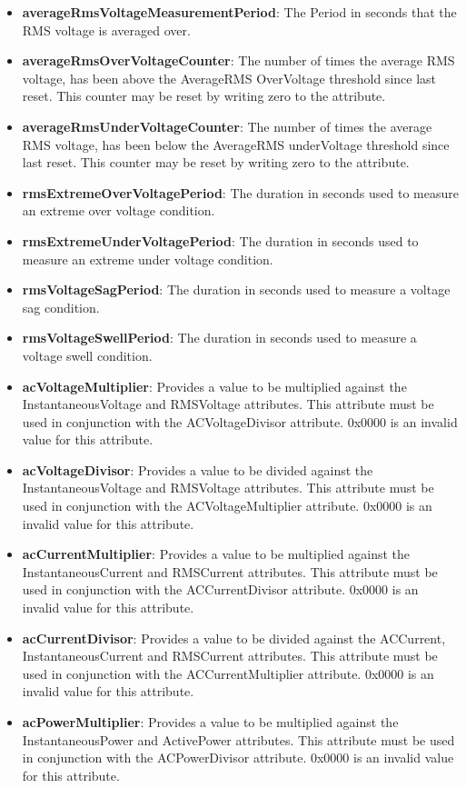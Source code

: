 \begin{itemize}
\item \textbf{averageRmsVoltageMeasurementPeriod}: The Period in seconds that the RMS voltage is averaged over.
\item \textbf{averageRmsOverVoltageCounter}: The number of times the average RMS voltage, has been above the AverageRMS OverVoltage threshold since last reset. This counter may be reset by writing zero to the attribute.
\item \textbf{averageRmsUnderVoltageCounter}: The number of times the average RMS voltage, has been below the AverageRMS underVoltage threshold since last reset. This counter may be reset by writing zero to the attribute.
\item \textbf{rmsExtremeOverVoltagePeriod}: The duration in seconds used to measure an extreme over voltage condition.
\item \textbf{rmsExtremeUnderVoltagePeriod}: The duration in seconds used to measure an extreme under voltage condition.
\item \textbf{rmsVoltageSagPeriod}: The duration in seconds used to measure a voltage sag condition.
\item \textbf{rmsVoltageSwellPeriod}: The duration in seconds used to measure a voltage swell condition.
\item \textbf{acVoltageMultiplier}: Provides a value to be multiplied against the InstantaneousVoltage and RMSVoltage attributes. This attribute must be used in conjunction with the ACVoltageDivisor attribute. 0x0000 is an invalid value for this attribute.
\item \textbf{acVoltageDivisor}: Provides a value to be divided against the InstantaneousVoltage and RMSVoltage attributes. This attribute must be used in conjunction with the ACVoltageMultiplier attribute. 0x0000 is an invalid value for this attribute.
\item \textbf{acCurrentMultiplier}: Provides a value to be multiplied against the InstantaneousCurrent and RMSCurrent attributes. This attribute must be used in conjunction with the ACCurrentDivisor attribute. 0x0000 is an invalid value for this attribute.
\item \textbf{acCurrentDivisor}: Provides a value to be divided against the ACCurrent, InstantaneousCurrent and RMSCurrent attributes. This attribute must be used in conjunction with the ACCurrentMultiplier attribute. 0x0000 is an invalid value for this attribute.
\item \textbf{acPowerMultiplier}: Provides a value to be multiplied against the InstantaneousPower and ActivePower attributes. This attribute must be used in conjunction with the ACPowerDivisor attribute. 0x0000 is an invalid value for this attribute.

\end{itemize}
